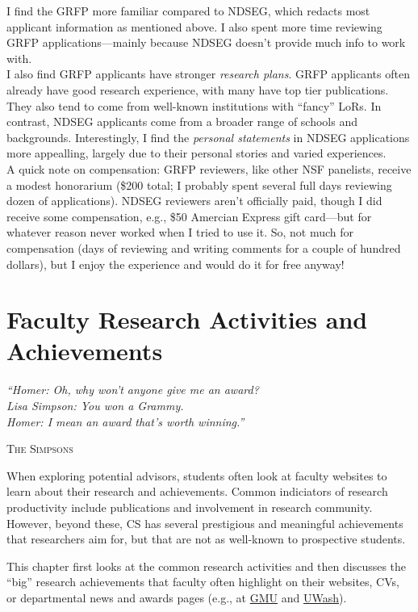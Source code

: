 \documentclass[oneside,11pt]{book}
\newcommand{\myepigraphsimpsons}[1]{
  \epigraph{\vspace{-0.2in} \emph{#1}}{\textsc{The Simpsons}}
}
\newenvironment{commentbox}[1][]{
  \small
  \begin{marker}[\faChessPawn{}]
    {\textbf{#1}}
  }{
  \end{marker}
}
\begin{document}
\begin{commentbox}
I find the GRFP more familiar compared to NDSEG, which redacts most applicant information as mentioned above. I also spent more time reviewing GRFP applications---mainly because NDSEG doesn't provide much info to work with.
\\

I also find GRFP applicants have stronger \emph{research plans}. GRFP applicants often already have good research experience, with many have top tier publications. They also tend to come from well-known institutions with ``fancy'' LoRs. In contrast, NDSEG applicants come from a broader range of schools and backgrounds. Interestingly, I find the \emph{personal statements} in NDSEG applications more appealling, largely due to their personal stories and varied experiences.
\\

A quick note on compensation: GRFP reviewers, like other NSF panelists, receive a modest honorarium (\$200 total; I probably spent several full days reviewing dozen of applications). NDSEG reviewers aren't officially paid, though I did receive some compensation, e.g., \$50 Amercian Express gift card---but for whatever reason never worked when I tried to use it. So, not much for compensation (days of reviewing and writing comments for a couple of hundred dollars), but I enjoy the experience and would do it for free anyway!
\end{commentbox}



\chapter{Faculty Research Activities and Achievements}\label{chap:research-achievements}
\myepigraphsimpsons{``Homer: Oh, why won’t anyone give me an award?\\
Lisa Simpson: You won a Grammy.\\
Homer: I mean an award that's worth winning.''}

When exploring potential advisors, students often look at faculty websites to learn about their research and achievements. Common indiciators of research productivity include publications and involvement in research community. However, beyond these, CS has several prestigious and meaningful achievements that researchers aim for, but that are not as well-known to prospective students. 

This chapter first looks at the common research activities and then discusses the ``big'' research achievements that faculty often highlight on their websites, CVs, or departmental news and awards pages (e.g., at \href{https://cs.gmu.edu/about/faculty-awards/}{GMU} and \href{https://www.cs.washington.edu/people/honors-awards/}{UWash}).
\end{document}
